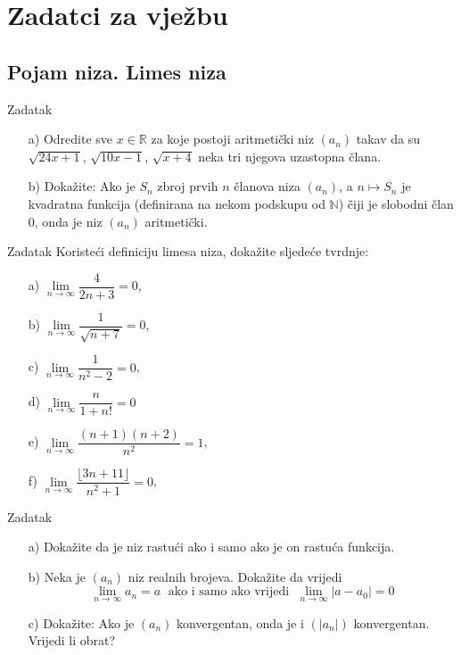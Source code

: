 \section*{Zadatci za vježbu}
\subsection*{Pojam niza. Limes niza}
\begin{exercise}{Zadatak}\textbf{}
\begin{itemize}
\item[a)] Odredite sve \(x\in \mathbb{R}\) za koje postoji aritmetički niz \((a_n)\) takav da su \(\sqrt{24x+1}\), \(\sqrt{10x-1}\), \(\sqrt{x+4}\) neka tri njegova uzastopna člana.
\item[b)] Dokažite: Ako je \(S_n\) zbroj prvih \(n\) članova niza \((a_n)\), a \(n\mapsto S_n\) je kvadratna funkcija (definirana na nekom podskupu od \(\mathbb{N}\)) čiji je slobodni član \(0\), onda je niz \((a_n)\) aritmetički.
\end{itemize}
\end{exercise}
\begin{exercise}{Zadatak}
Koristeći definiciju limesa niza, dokažite sljedeće tvrdnje:
\begin{multicols}{2}
\begin{itemize}
\item[a)] \(\lim\limits_{n\to \infty}{\dfrac{4}{2n+3}}=0\),
\item[b)] \(\lim\limits_{n\to \infty}{\dfrac{1}{\sqrt{n+7}}}=0\),
\item[c)] \(\lim\limits_{n\to \infty}{\dfrac{1}{n^2-2}}=0\),
\item[d)] \(\lim\limits_{n\to\infty}{\dfrac{n}{1+n!}}=0\)
\item[e)] \(\lim\limits_{n\to \infty}{\dfrac{(n+1)(n+2)}{n^2}}=1\),
\item[f)] \(\lim\limits_{n\to \infty}{\dfrac{\lfloor 3n+11\rfloor}{n^2+1}}=0\),
\end{itemize}
\end{multicols}
\end{exercise}
\begin{exercise}{Zadatak} 
\label{seqfunex}
\textbf{}
\begin{itemize}
\item[a)] Dokažite da je niz rastući ako i samo ako je on rastuća funkcija.
\item[b)] Neka je \((a_n)\) niz realnih brojeva. Dokažite da vrijedi \[\lim\limits_{n\to \infty}{a_n}=a\;\text{ ako i samo ako vrijedi }\;\lim\limits_{n\to \infty}{|a-a_0|}=0\]
\item[c)] Dokažite: Ako je \((a_n)\) konvergentan, onda je i \((|a_n|)\) konvergentan. Vrijedi li obrat?
\end{itemize}
\end{exercise}

